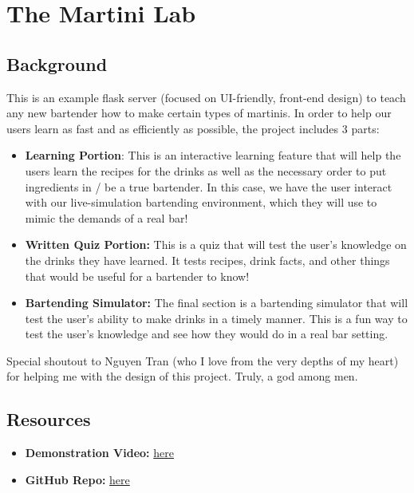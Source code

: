 \section{The Martini Lab}
\subsection{Background}
This is an example flask server (focused on UI-friendly, front-end design) to teach any new bartender how to make certain types of martinis. In order to help our users learn as fast and as efficiently as possible, the project includes 3 parts:
\begin{itemize}
    \item \textbf{Learning Portion}: This is an interactive learning feature that will help the users learn the recipes for the drinks as well as the necessary order to put ingredients in / be a true bartender. In this case, we have the user interact with our live-simulation bartending environment, which they will use to mimic the demands of a real  bar!
    \item \textbf{Written Quiz Portion:} This is a quiz that will test the user's knowledge on the drinks they have learned. It tests recipes, drink facts, and other things that would be useful for a bartender to know!
    \item \textbf{Bartending Simulator:} The final section is a bartending simulator that will test the user's ability to make drinks in a timely manner. This is a fun way to test the user's knowledge and see how they would do in a real bar setting.
\end{itemize}
Special shoutout to Nguyen Tran (who I love from the very depths of my heart) for helping me with the design of this project. Truly, a god among men.
\subsection{Resources}
\begin{itemize}
    \item \textbf{Demonstration Video:} \href{https://youtube.com/watch?v=3N8m4HOGbX0&ab_channel=ConnorSeanLi}{here}
    \item \textbf{GitHub Repo:} \href{https://github.com/connorli18/uiux-final-group4}{here}
\end{itemize}